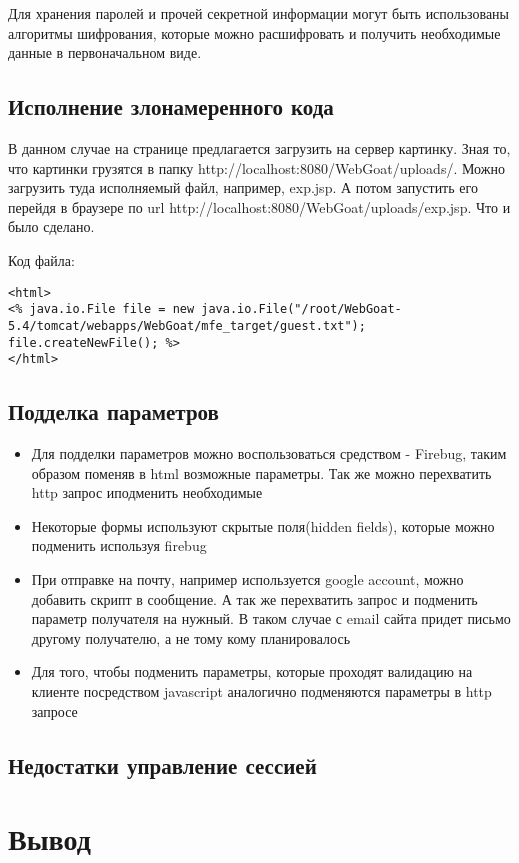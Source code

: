 \documentclass[11pt, a4paper]{article}		%
\begin{document}
Для хранения паролей и прочей секретной информации могут быть использованы алгоритмы шифрования, которые можно расшифровать и получить необходимые данные в первоначальном виде.



\subsection{Исполнение злонамеренного кода}

В данном случае на странице предлагается загрузить на сервер картинку. Зная то, что картинки грузятся в папку  http://localhost:8080/WebGoat/uploads/. Можно загрузить туда исполняемый файл, например, exp.jsp. А потом запустить его перейдя в браузере по url http://localhost:8080/WebGoat/uploads/exp.jsp. Что и было сделано.

Код файла: 

\begin{verbatim}
<html>
<% java.io.File file = new java.io.File("/root/WebGoat-5.4/tomcat/webapps/WebGoat/mfe_target/guest.txt");
file.createNewFile(); %>
</html>
\end{verbatim}



\subsection{Подделка параметров}

\begin{itemize}

\item Для подделки параметров можно воспользоваться средством - Firebug, таким образом поменяв в html возможные параметры. Так же можно перехватить http запрос иподменить необходимые

\item Некоторые формы используют скрытые поля(hidden fields), которые можно подменить используя firebug

\item При отправке на почту, например используется google account, можно добавить скрипт в сообщение. А так же перехватить запрос и подменить параметр получателя на нужный. В таком случае с email сайта придет письмо другому получателю, а не тому кому планировалось

\item Для того, чтобы подменить параметры, которые проходят валидацию на клиенте посредством javascript аналогично подменяются параметры в http запросе

\end{itemize}



\subsection{Недостатки управление сессией}







\section{Вывод}
\end{document}
